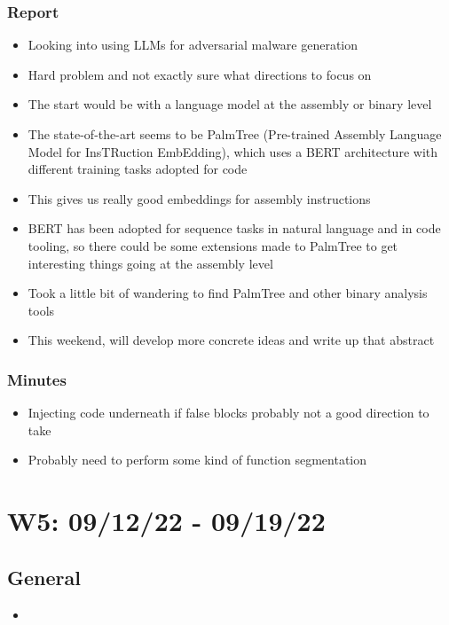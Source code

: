 \documentclass{article}
\begin{document}
\subsubsection*{Report}
\begin{itemize}
	\item Looking into using LLMs for adversarial malware generation
	\item Hard problem and not exactly sure what directions to focus on
	\item The start would be with a language model at the assembly or binary level
	\item The state-of-the-art seems to be PalmTree (Pre-trained Assembly Language Model for InsTRuction EmbEdding), which uses a BERT architecture with different training tasks adopted for code
	\item This gives us really good embeddings for assembly instructions
	\item BERT has been adopted for sequence tasks in natural language and in code tooling, so there could be some extensions made to PalmTree to get interesting things going at the assembly level
	\item Took a little bit of wandering to find PalmTree and other binary analysis tools
	\item This weekend, will develop more concrete ideas and write up that abstract
\end{itemize}
\subsubsection*{Minutes}
\begin{itemize}
	\item Injecting code underneath if false blocks probably not a good direction to take
	\item Probably need to perform some kind of function segmentation
\end{itemize}

\pagebreak


\section*{W5: 09/12/22 - 09/19/22}

\subsection*{General}
\begin{itemize}
	\item 
\end{itemize}
\end{document}
